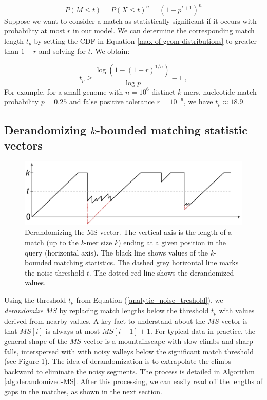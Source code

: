 \documentclass[unnumsec,webpdf,contemporary,large]{oup-authoring-template}%
\theoremstyle{thmstyleone}%
\theoremstyle{thmstyletwo}%
\theoremstyle{thmstylethree}%
\begin{document}
\begin{equation}
    P\left(M \leq t\right) = P\left(X \leq t\right)^n = \left(1 - p^{t + 1}\right)^n
\label{max-of-geom-distributions}    
\end{equation}
Suppose we want to consider a match as statistically significant if it occurs with probability at most $r$ in our model. We can determine the corresponding match length $t_p$ by setting the CDF in Equation \ref{max-of-geom-distributions} to greater than $1-r$ and solving for $t$. We obtain:

\begin{equation}\label{analytic_noise_treshold}
t_p \geq \frac{\log (1 - (1-r)^{1/n})}{\log p} - 1\;,
\end{equation}
For example, for a small genome with $n = 10^6$ distinct $k$-mers,  nucleotide match probability $p = 0.25$ and false positive tolerance $r = 10^{-6}$, we have $t_p \approx 18.9$.

\subsection{\texorpdfstring{Derandomizing $k$-bounded matching statistic vectors}{Derandomizing k-bounded matching statistic vectors}}


\begin{figure}[b]
    \centering
    \includegraphics[width=1.0\linewidth]{fig/derandomized_MS.drawio.pdf}
    \caption{Derandomizing the MS vector. The vertical axis is the length of a match (up to the \emph{k}-mer size $k$) ending at a given position in the query (horizontal axis). The black line shows values of the \textit{k}-bounded matching statistics. The dashed grey horizontal line marks the noise threshold $t$. The dotted red line shows the derandomized values.}
    \label{fig:derandomization}
\end{figure}
Using the threshold $t_p$ from Equation (\ref{analytic_noise_treshold}), we \emph{derandomize} $MS$ by replacing match lengths below the threshold $t_p$ with values derived from nearby values. A key fact to understand about the $MS$ vector is that $MS[i]$ is always at most $MS[i-1]+1$. For typical data in practice, the general shape of the $MS$ vector is a mountainscape with slow climbs and sharp falls, interspersed with with noisy valleys below the significant match threshold (see Figure \ref{fig:derandomization}). The idea of derandomization is to extrapolate the climbs backward to eliminate the noisy segments. The process is detailed in Algorithm \ref{alg:derandomized-MS}. After this processing, we can easily read off the lengths of gaps in the matches, as shown in the next section.
\end{document}
